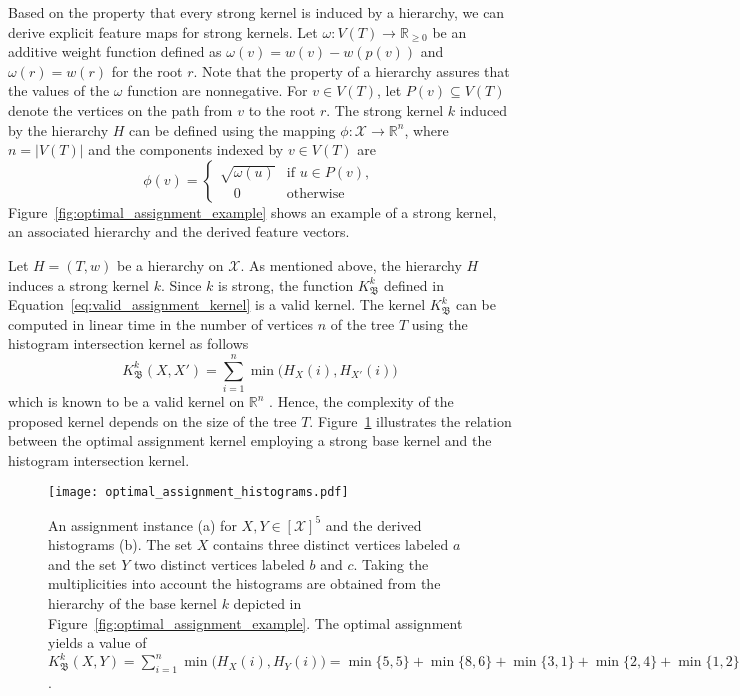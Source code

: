 \documentclass[twoside,11pt]{article}
\begin{document}
Based on the property that every strong kernel is induced by a hierarchy, we can derive explicit feature maps for strong kernels.
Let $\omega : V(T) \rightarrow \mathbb{R}_{\geq 0}$ be an additive weight function defined as $\omega(v) = w(v) - w(p(v))$ and $\omega(r) = w(r)$ for the root $r$.
Note that the property of a hierarchy assures that the values of the $\omega$ function are nonnegative.
For $v \in V(T)$, let $P(v) \subseteq V(T)$ denote the vertices on the path from $v$ to the root $r$.
The strong kernel $k$ induced by the hierarchy $H$ can be defined using the mapping $\phi : \mathcal{X} \rightarrow \mathbb{R}^n$, where $n = |V(T)|$ and the components indexed by $v \in V(T)$ are
\begin{equation}
  \phi(v) = \left\{
  \begin{array}{lr}
    \sqrt{\omega(u)} & \text{if }u \in P(v),\\
    \quad 0 & \text{otherwise}
  \end{array}
\right.
\end{equation}
Figure~\ref{fig:optimal_assignment_example} shows an example of a strong kernel, an associated hierarchy and the derived feature vectors.

Let $H = (T,w)$ be a hierarchy on $\mathcal{X}$.
As mentioned above, the hierarchy $H$ induces a strong kernel $k$.
Since $k$ is strong, the function $K_\mathfrak{B}^k$ defined in Equation~\ref{eq:valid_assignment_kernel} is a valid kernel.
The kernel $K_\mathfrak{B}^k$ can be computed in linear time in the number of vertices $n$ of the tree $T$ using the histogram intersection kernel  as follows
\begin{equation}
  K_\mathfrak{B}^k(X, X') = \sum_{i=1}^n \min\big(H_{X}(i),H_{X'}(i)\big)
\end{equation}
which is known to be a valid kernel on $\mathbb{R}^n$ .
Hence, the complexity of the proposed kernel depends on the size of the tree $T$.
Figure~\ref{fig:optimal_assignment_histograms} illustrates the relation between the optimal assignment kernel employing a strong base kernel and the histogram intersection kernel.
\begin{figure}[t]
  \centering
  \texttt{[image: optimal\_assignment\_histograms.pdf]}
  \caption{An assignment instance (a) for $X,Y \in [\mathcal{X}]^5$ and the derived histograms (b). The set $X$ contains three distinct vertices labeled $a$ and the set $Y$ two distinct vertices labeled $b$ and $c$. Taking the multiplicities into account the histograms are obtained from the hierarchy of the base kernel $k$ depicted in Figure~\ref{fig:optimal_assignment_example}.  The optimal assignment yields a value of $K_\mathfrak{B}^k(X, Y) = \sum_{i=1}^n \min\big(H_{X}(i),H_{Y}(i)\big) = \min\{5,5\}+ \min\{8,6\}+ \min\{3,1\}+ \min\{2,4\}+ \min\{1,2\}=15$.}
  \label{fig:optimal_assignment_histograms}
\end{figure}
\end{document}
